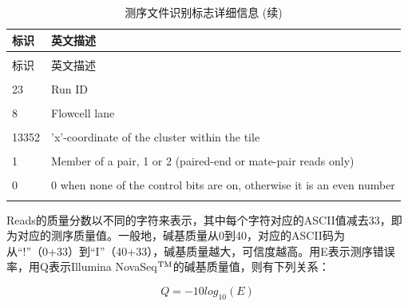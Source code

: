 \documentclass[
  a4paper,
  titlepage]{article}
\begin{document}
\begin{longtable}[t]{ll}
\caption{\label{tab:fastq-details}测序文件识别标志详细信息}\\
\toprule
标识 & 英文描述\\
\midrule
\endfirsthead
\caption[]{\label{tab:fastq-details}测序文件识别标志详细信息 (续)}\\
\toprule
标识 & 英文描述\\
\midrule
\endhead
\hline
\endfoot
\bottomrule
\endlastfoot
\cellcolor{gray!6}{E00491} & \cellcolor{gray!6}{Unique instrument name}\\
 
23 & Run ID\\
 
\cellcolor{gray!6}{HVT7LCCXX} & \cellcolor{gray!6}{Flowcell ID}\\
 
8 & Flowcell lane\\
 
\cellcolor{gray!6}{1101} & \cellcolor{gray!6}{Tile number within the flowcell lane}\\
 
13352 & 'x'-coordinate of the cluster within the tile\\
 
\cellcolor{gray!6}{1520} & \cellcolor{gray!6}{'y'-coordinate of the cluster within the tile}\\
 
1 & Member of a pair, 1 or 2 (paired-end or mate-pair reads only)\\
 
\cellcolor{gray!6}{N} & \cellcolor{gray!6}{Y if the read fails filter (read is bad), N otherwise}\\
 
0 & 0 when none of the control bits are on, otherwise it is an even number\\
 
\cellcolor{gray!6}{CTATAC} & \cellcolor{gray!6}{Index sequence}\\*
\end{longtable}

Reads的质量分数以不同的字符来表示，其中每个字符对应的ASCII值减去33，即为对应的测序质量值。一般地，碱基质量从0到40，对应的ASCII码为从``!''（0+33）到``I''（40+33），碱基质量越大，可信度越高。用E表示测序错误率，用Q表示Illumina NovaSeq\(\rm{^{TM}}\)的碱基质量值，则有下列关系：

\[ Q = -10log_{10}(E) \]
\end{document}
